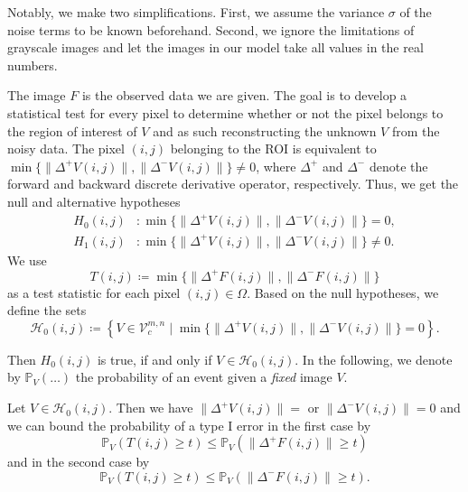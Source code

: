 \documentclass[a4paper,12pt]{article}
\newcommand{\norm}[1]{\lVert#1\rVert}
\theoremstyle{plain}
\theoremstyle{definition}
\begin{document}
Notably, we make two simplifications. First, we assume the variance $\sigma$ of the noise terms to be known beforehand. Second, we ignore the limitations of grayscale images and let the images in our model take all values in the real numbers.

The image $F$ is the observed data we are given. The goal is to develop a statistical test for every pixel to determine whether or not the pixel belongs to the region of interest of $V$ and as such reconstructing the unknown $V$ from the noisy data. The pixel $(i, j)$ belonging to the ROI is equivalent to $\min \{ \norm{\Delta^+ V(i, j)}, \norm{\Delta^- V(i, j)} \} \neq 0$, where $\Delta^+$ and $\Delta^-$ denote the forward and backward discrete derivative operator, respectively. Thus, we get the null and alternative hypotheses
\begin{align*}
	H_0(i, j)&: \min \{ \norm{\Delta^+ V(i, j)}, \norm{\Delta^- V(i, j)} \} = 0, \\
	H_1(i, j)&: \min \{ \norm{\Delta^+ V(i, j)}, \norm{\Delta^- V(i, j)} \} \neq 0.
\end{align*}
We use
\begin{equation*}
	T(i, j) \coloneqq \min \{ \norm{\Delta^+ F(i, j)}, \norm{\Delta^- F(i, j)} \}
\end{equation*}
as a test statistic for each pixel $(i, j) \in \Omega$. Based on the null hypotheses, we define the sets
\begin{equation*}
	\mathcal{H}_0(i, j) \coloneqq \left\{ V \in \mathcal{V}_c^{m, n} \mid \min \{ \norm{\Delta^+ V(i, j)}, \norm{\Delta^- V(i, j)} \} = 0 \right\}.
\end{equation*}

Then $H_0(i, j)$ is true, if and only if $V \in \mathcal{H}_0(i, j)$. In the following, we denote by $\mathbb{P}_V( \ldots )$ the probability of an event given a \emph{fixed} image $V$.

Let $V \in \mathcal{H}_0(i, j)$. Then we have $\norm{\Delta^+ V(i, j)} = $ or $\norm{\Delta^- V(i, j)} = 0$ and we can bound the probability of a type I error in the first case by
\begin{equation*}
	\mathbb{P}_V( T(i, j) \geq t ) \leq \mathbb{P}_V( \norm{\Delta^+ F(i, j)} \geq t )
\end{equation*}
and in the second case by
\begin{equation*}
	\mathbb{P}_V( T(i, j) \geq t ) \leq \mathbb{P}_V( \norm{\Delta^- F(i, j)} \geq t ).
\end{equation*}
\end{document}
